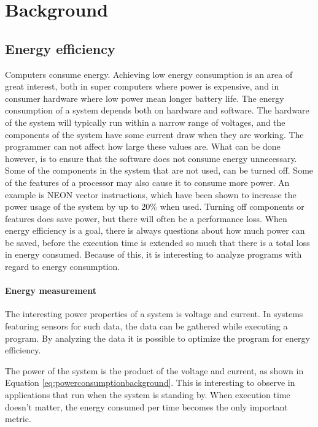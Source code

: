 \chapter[Background]{Background}

\section{Energy efficiency} \label{energymeasurement}
Computers consume energy.
Achieving low energy consumption is an area of great interest, both in super computers where power is expensive, and in consumer hardware where low power mean longer battery life.
The energy consumption of a system depends both on hardware and software.
The hardware of the system will typically run within a narrow range of voltages, and the components of the system have some current draw when they are working.
The programmer can not affect how large these values are.
What can be done however, is to ensure that the software does not consume energy unnecessary.
Some of the components in the system that are not used, can be turned off.
Some of the features of a processor may also cause it to consume more power.
An example is NEON vector instructions, which have been shown to increase the power usage of the system by up to 20\% \cite{lillesand13} when used.
Turning off components or features does save power, but there will often be a performance loss.
When energy efficiency is a goal, there is always questions about how much power can be saved, before the execution time is extended so much that there is a total loss in energy consumed.
Because of this, it is interesting to analyze programs with regard to energy consumption.

\subsubsection{Energy measurement}
The interesting power properties of a system is voltage and current.
In systems featuring sensors for such data, the data can be gathered while executing a program.
By analyzing the data it is possible to optimize the program for energy efficiency.

The power of the system is the product of the voltage and current, as shown in Equation \ref{eq:powerconsumptionbackground}.
This is interesting to observe in applications that run when the system is standing by.
When execution time doesn't matter, the energy consumed per time becomes the only important metric.

